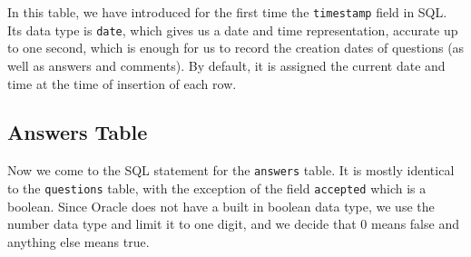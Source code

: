 In this table, we have introduced for the first time the \verb`timestamp` field in SQL. Its data type is \verb`date`, which gives us a date and time representation, accurate up to one second, which is enough for us to record the creation dates of questions (as well as answers and comments). By default, it is assigned the current date and time at the time of insertion of each row.


\subsection{Answers Table}

Now we come to the SQL statement for the \verb`answers` table. It is mostly identical to the \verb`questions` table, with the exception of the field \verb`accepted` which is a boolean. Since Oracle does not have a built in boolean data type, we use the number data type and limit it to one digit, and we decide that 0 means false and anything else means true.

